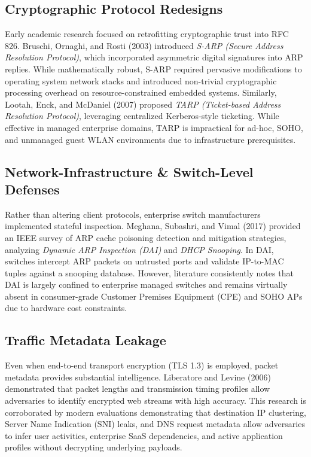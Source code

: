 \documentclass[conference]{IEEEtran}
\begin{document}
\subsection{Cryptographic Protocol Redesigns}
Early academic research focused on retrofitting cryptographic trust into RFC 826. Bruschi, Ornaghi, and Rosti (2003) \cite{bruschi2003sarp} introduced \textit{S-ARP (Secure Address Resolution Protocol)}, which incorporated asymmetric digital signatures into ARP replies. While mathematically robust, S-ARP required pervasive modifications to operating system network stacks and introduced non-trivial cryptographic processing overhead on resource-constrained embedded systems. Similarly, Lootah, Enck, and McDaniel (2007) \cite{lootah2007tarp} proposed \textit{TARP (Ticket-based Address Resolution Protocol)}, leveraging centralized Kerberos-style ticketing. While effective in managed enterprise domains, TARP is impractical for ad-hoc, SOHO, and unmanaged guest WLAN environments due to infrastructure prerequisites.

\subsection{Network-Infrastructure \& Switch-Level Defenses}
Rather than altering client protocols, enterprise switch manufacturers implemented stateful inspection. Meghana, Subashri, and Vimal (2017) \cite{meghana2017survey} provided an IEEE survey of ARP cache poisoning detection and mitigation strategies, analyzing \textit{Dynamic ARP Inspection (DAI)} and \textit{DHCP Snooping}. In DAI, switches intercept ARP packets on untrusted ports and validate IP-to-MAC tuples against a snooping database. However, literature consistently notes that DAI is largely confined to enterprise managed switches and remains virtually absent in consumer-grade Customer Premises Equipment (CPE) and SOHO APs due to hardware cost constraints.

\subsection{Traffic Metadata Leakage}
Even when end-to-end transport encryption (TLS 1.3) is employed, packet metadata provides substantial intelligence. Liberatore and Levine (2006) \cite{liberatore2006inferring} demonstrated that packet lengths and transmission timing profiles allow adversaries to identify encrypted web streams with high accuracy. This research is corroborated by modern evaluations demonstrating that destination IP clustering, Server Name Indication (SNI) leaks, and DNS request metadata allow adversaries to infer user activities, enterprise SaaS dependencies, and active application profiles without decrypting underlying payloads.
\end{document}
